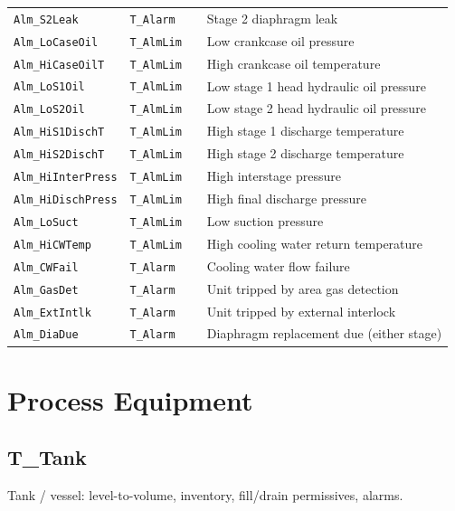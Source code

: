 \begin{small}
\begin{longtable}{@{}P{3.70cm}P{2.20cm}P{1.70cm}P{8.91cm}@{}}
\texttt{Alm\_S2Leak} & \texttt{T\_Alarm} &  & Stage 2 diaphragm leak \\
\texttt{Alm\_LoCaseOil} & \texttt{T\_AlmLim} &  & Low crankcase oil pressure \\
\texttt{Alm\_HiCaseOilT} & \texttt{T\_AlmLim} &  & High crankcase oil temperature \\
\texttt{Alm\_LoS1Oil} & \texttt{T\_AlmLim} &  & Low stage 1 head hydraulic oil pressure \\
\texttt{Alm\_LoS2Oil} & \texttt{T\_AlmLim} &  & Low stage 2 head hydraulic oil pressure \\
\texttt{Alm\_HiS1DischT} & \texttt{T\_AlmLim} &  & High stage 1 discharge temperature \\
\texttt{Alm\_HiS2DischT} & \texttt{T\_AlmLim} &  & High stage 2 discharge temperature \\
\texttt{Alm\_HiInterPress} & \texttt{T\_AlmLim} &  & High interstage pressure \\
\texttt{Alm\_HiDischPress} & \texttt{T\_AlmLim} &  & High final discharge pressure \\
\texttt{Alm\_LoSuct} & \texttt{T\_AlmLim} &  & Low suction pressure \\
\texttt{Alm\_HiCWTemp} & \texttt{T\_AlmLim} &  & High cooling water return temperature \\
\texttt{Alm\_CWFail} & \texttt{T\_Alarm} &  & Cooling water flow failure \\
\texttt{Alm\_GasDet} & \texttt{T\_Alarm} &  & Unit tripped by area gas detection \\
\texttt{Alm\_ExtIntlk} & \texttt{T\_Alarm} &  & Unit tripped by external interlock \\
\texttt{Alm\_DiaDue} & \texttt{T\_Alarm} &  & Diaphragm replacement due (either stage) \\
\bottomrule
\end{longtable}
\end{small}

\section{Process Equipment}

\subsection{T\_Tank}\label{sec:pclib-t-tank}

Tank /\allowbreak{} vessel: level-to-volume, inventory, fill/\allowbreak{}drain permissives, alarms.


